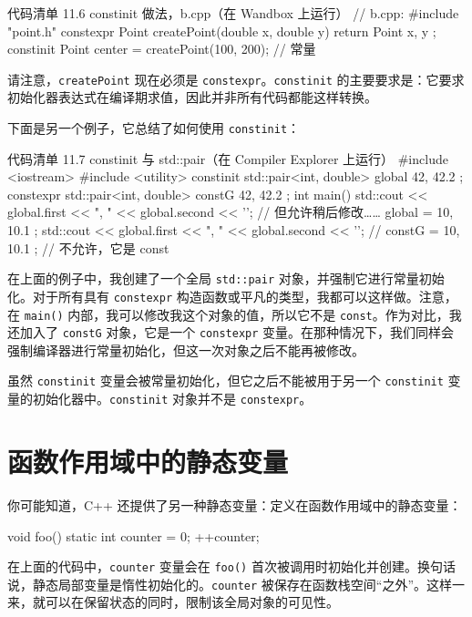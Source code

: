 \begin{codeboxt}[cpp]{代码清单 11.6 constinit 做法，b.cpp（在 Wandbox 上运行）}
// b.cpp:
#include "point.h"
constexpr Point createPoint(double x, double y) {
return Point { x, y };
}
constinit Point center = createPoint(100, 200); // 常量
\end{codeboxt}

请注意，\texttt{createPoint} 现在必须是 \texttt{constexpr}。\texttt{constinit} 的主要要求是：它要求初始化器表达式在编译期求值，因此并非所有代码都能这样转换。

下面是另一个例子，它总结了如何使用 \texttt{constinit}：

\begin{codeboxt}[cpp]{代码清单 11.7 constinit 与 std::pair（在 Compiler Explorer 上运行）}
#include <iostream>
#include <utility>
constinit std::pair<int, double> global { 42, 42.2 };
constexpr std::pair<int, double> constG { 42, 42.2 };
int main() {
std::cout << global.first << ", " << global.second << '\n';
// 但允许稍后修改……
global = { 10, 10.1 };
std::cout << global.first << ", " << global.second << '\n';
// constG = { 10, 10.1 }; // 不允许，它是 const
}
\end{codeboxt}

在上面的例子中，我创建了一个全局 \texttt{std::pair} 对象，并强制它进行常量初始化。对于所有具有 \texttt{constexpr} 构造函数或平凡的类型，我都可以这样做。注意，在 \texttt{main()} 内部，我可以修改我这个对象的值，所以它不是 \texttt{const}。作为对比，我还加入了 \texttt{constG} 对象，它是一个 \texttt{constexpr} 变量。在那种情况下，我们同样会强制编译器进行常量初始化，但这一次对象之后不能再被修改。

\begin{myWarnBox}
虽然 \texttt{constinit} 变量会被常量初始化，但它之后不能被用于另一个 \texttt{constinit} 变量的初始化器中。\texttt{constinit} 对象并不是 \texttt{constexpr}。
\end{myWarnBox}


\section{函数作用域中的静态变量}

你可能知道，C++ 还提供了另一种静态变量：定义在函数作用域中的静态变量：

\begin{codebox}[cpp]
void foo() {
static int counter = 0;
++counter;
}
\end{codebox}

在上面的代码中，\texttt{counter} 变量会在 \texttt{foo()} 首次被调用时初始化并创建。换句话说，静态局部变量是惰性初始化的。\texttt{counter} 被保存在函数栈空间“之外”。这样一来，就可以在保留状态的同时，限制该全局对象的可见性。

